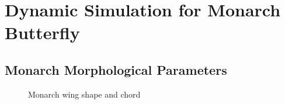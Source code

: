 \documentclass[conf]{new-aiaa}
\begin{document}
\section{Dynamic Simulation for Monarch Butterfly}\label{sec:Monarch}

\subsection{Monarch Morphological Parameters}

\begin{figure}
    \centerline{
        \hfill
    }
    \caption{Monarch wing shape and chord}\label{fig:Monarch_wing}
\end{figure}
\end{document}
